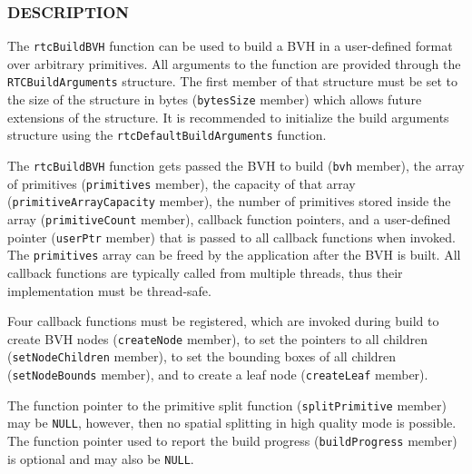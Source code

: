 \begin{Shaded}
\begin{Highlighting}[]
\OperatorTok{();}

\OperatorTok{*}\OperatorTok{(}
   \OperatorTok{*}
\OperatorTok{);}
\end{Highlighting}
\end{Shaded}

\subsubsection{DESCRIPTION}\label{description}

The \texttt{rtcBuildBVH} function can be used to build a BVH in a
user-defined format over arbitrary primitives. All arguments to the
function are provided through the \texttt{RTCBuildArguments} structure.
The first member of that structure must be set to the size of the
structure in bytes (\texttt{bytesSize} member) which allows future
extensions of the structure. It is recommended to initialize the build
arguments structure using the \texttt{rtcDefaultBuildArguments}
function.

The \texttt{rtcBuildBVH} function gets passed the BVH to build
(\texttt{bvh} member), the array of primitives (\texttt{primitives}
member), the capacity of that array (\texttt{primitiveArrayCapacity}
member), the number of primitives stored inside the array
(\texttt{primitiveCount} member), callback function pointers, and a
user-defined pointer (\texttt{userPtr} member) that is passed to all
callback functions when invoked. The \texttt{primitives} array can be
freed by the application after the BVH is built. All callback functions
are typically called from multiple threads, thus their implementation
must be thread-safe.

Four callback functions must be registered, which are invoked during
build to create BVH nodes (\texttt{createNode} member), to set the
pointers to all children (\texttt{setNodeChildren} member), to set the
bounding boxes of all children (\texttt{setNodeBounds} member), and to
create a leaf node (\texttt{createLeaf} member).

The function pointer to the primitive split function
(\texttt{splitPrimitive} member) may be \texttt{NULL}, however, then no
spatial splitting in high quality mode is possible. The function pointer
used to report the build progress (\texttt{buildProgress} member) is
optional and may also be \texttt{NULL}.

